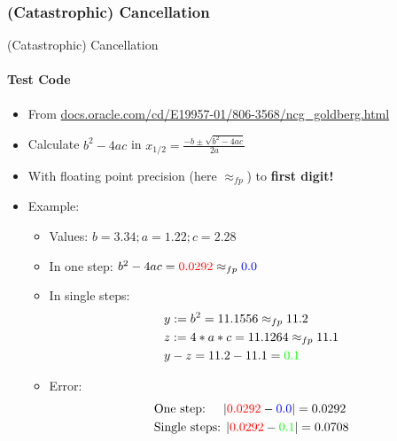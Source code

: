 \documentclass[9pt,pdftex]{beamer}
\begin{document}
\subsubsection{(Catastrophic) Cancellation}
\begin{frame}[fragile]{(Catastrophic) Cancellation}
\framesubtitle{Test Code}
\begin{itemize}
\item From \url{docs.oracle.com/cd/E19957-01/806-3568/ncg_goldberg.html}
\item Calculate $b^2-4ac$ in $x_{1/2}=\frac{-b \pm \sqrt{b^2-4ac}}{2a}$
\item With floating point precision (here $\approx_{fp}$) to \textbf{first digit!}
\item Example:
	\begin{itemize}
	\item Values: $b = 3.34; a = 1.22; c = 2.28$
	\item In one step: $b^2-4ac = \textcolor{red}{0.0292} \approx_{fp} \textcolor{blue}{0.0}$
	\item In single steps: 
				\begin{equation}
				\begin{split}
				&y  := b^2 = 11.1556 \approx_{fp} 11.2  \\
				&z := 4*a*c = 11.1264 \approx_{fp} 11.1 \\
				&y - z = 11.2-11.1 = \textcolor{green}{0.1}
				\end{split}
				\end{equation}
	\item Error:
				\begin{equation}
				\begin{split}
				&\text{One step: \quad } |\textcolor{red}{0.0292}- \textcolor{blue}{0.0}| = 0.0292 \\
				&\text{Single steps: } |\textcolor{red}{0.0292}-\textcolor{green}{0.1}| = 0.0708
				\end{split}
				\end{equation}
	\end{itemize}

\end{itemize}
\end{frame}
\end{document}
